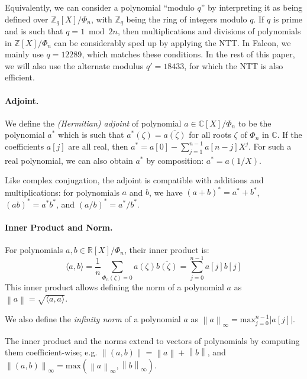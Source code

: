 \documentclass{llncs}
\newcommand{\bZ}{\mathbb{Z}}
\newcommand{\bR}{\mathbb{R}}
\newcommand{\bC}{\mathbb{C}}
\newcommand{\norm}[1]{\left\|#1\right\|}
\newcommand{\norminf}[1]{\norm{#1}_{\infty}}
\newcommand{\adj}[1]{{#1}^*}
\newcommand{\cconj}[1]{\overline{#1}}
\newcommand{\inner}[2]{\langle #1, #2 \rangle}
\begin{document}
Equivalently, we can consider a polynomial ``modulo $q$'' by interpreting
it as being defined over $\bZ_q[X]/\Phi_n$, with $\bZ_q$ being
the ring of integers modulo $q$. If $q$ is prime and is such that
$q = 1 \bmod{2n}$, then multiplications and divisions of polynomials
in $\bZ[X]/\Phi_n$ can be considerably sped up by applying the NTT. In
Falcon, we mainly use $q = 12289$, which matches these conditions. In
the rest of this paper, we will also use the alternate modulus
$q' = 18433$, for which the NTT is also efficient.

\paragraph{Adjoint.}
We define the \emph{(Hermitian) adjoint} of polynomial $a \in
\bC[X]/\Phi_n$ to be the polynomial $\adj{a}$ which is such that
$\adj{a}(\zeta) = \cconj{a(\zeta)}$ for all roots $\zeta$ of $\Phi_n$ in
$\bC$. If the coefficients $a[j]$ are all real, then $\adj{a} = a[0] -
\sum_{j=1}^{n-1} a[n-j] X^j$. For such a real polynomial, we can also
obtain $\adj{a}$ by composition: $\adj{a} = a(1/X)$.

Like complex conjugation, the adjoint is compatible with additions and
multiplications: for polynomials $a$ and $b$, we have $\adj{(a + b)} =
\adj{a} + \adj{b}$, $\adj{(ab)} = \adj{a} \adj{b}$, and $\adj{(a/b)} =
\adj{a}/\adj{b}$.

\paragraph{Inner Product and Norm.}
For polynomials $a, b \in \bR[X]/\Phi_n$, their inner product is:
\begin{equation*}
    \inner{a}{b}
        = \frac{1}{n} \sum_{\Phi_n(\zeta) = 0} a(\zeta) \cconj{b(\zeta)}
        = \sum_{j=0}^{n-1} a[j] b[j]
\end{equation*}
This inner product allows defining the norm of a polynomial $a$ as
$\norm{a} = \sqrt{\inner{a}{a}}$.

We also define the \emph{infinity norm} of a polynomial $a$
as $\norminf{a} = \text{max}_{j=0}^{n-1} |a[j]|$.

The inner product and the norms extend to vectors of polynomials by
computing them coefficient-wise; e.g. $\norm{(a, b)} = \norm{a} + \norm{b}$,
and $\norminf{(a, b)} = \text{max}(\norminf{a}, \norminf{b})$.
\end{document}
